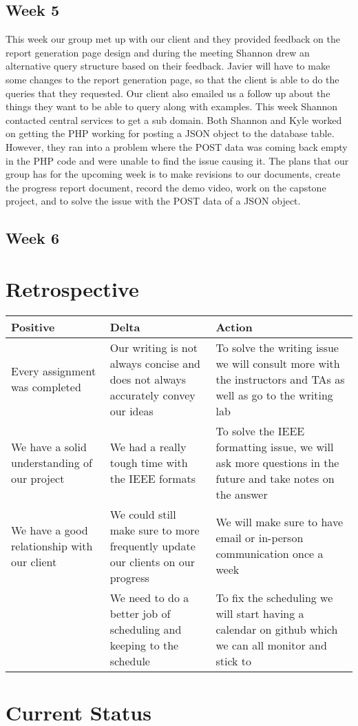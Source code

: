 \documentclass[letterpaper,10pt,serif, draftclsnofoot,onecolumn, compsoc, titlepage]{IEEEtran}
\begin{document}
\subsection{Week 5}
This week our group met up with our client and they provided feedback on the report generation page design and during the meeting Shannon drew an alternative query structure based on their feedback. Javier will have to make some changes to the report generation page, so that the client is able to do the queries that they requested. Our client also emailed us a follow up about the things they want to be able to query along with examples. This week Shannon contacted central services to get a sub domain. Both Shannon and Kyle worked on getting the PHP working for posting a JSON object to the database table. However, they ran into a problem where the POST data was coming back empty in the PHP code and were unable to find the issue causing it. The plans that our group has for the upcoming week is to make revisions to our documents, create the progress report document, record the demo video, work on the capstone project, and to solve the issue with the POST data of a JSON object. 

\subsection{Week 6} 


\section{Retrospective}
\begin{center}
    \begin{tabular}{ | p{5cm} | p{5cm} | p{5cm} |}
    \hline
     Positive & Delta & Action \\ \hline
  	Every assignment was completed & Our writing is not always concise and does not always accurately convey our ideas & To solve the writing issue we will consult more with the instructors and TAs as well as go to the writing lab \\\hline
	We have a solid understanding of our project & We had a really tough time with the IEEE formats & To solve the IEEE formatting issue, we will ask more questions in the future and take notes on the answer \\ \hline
	We have a good relationship with our client & We could still make sure to more frequently update our clients on our progress & We will make sure to have email or in-person communication once a week \\ \hline
	&We need to do a better job of scheduling and keeping to the schedule& To fix the scheduling we will start having a calendar on github which we can all monitor and stick to \\ \hline
    \end{tabular}
\end{center}

\section{Current Status}
\end{document}
